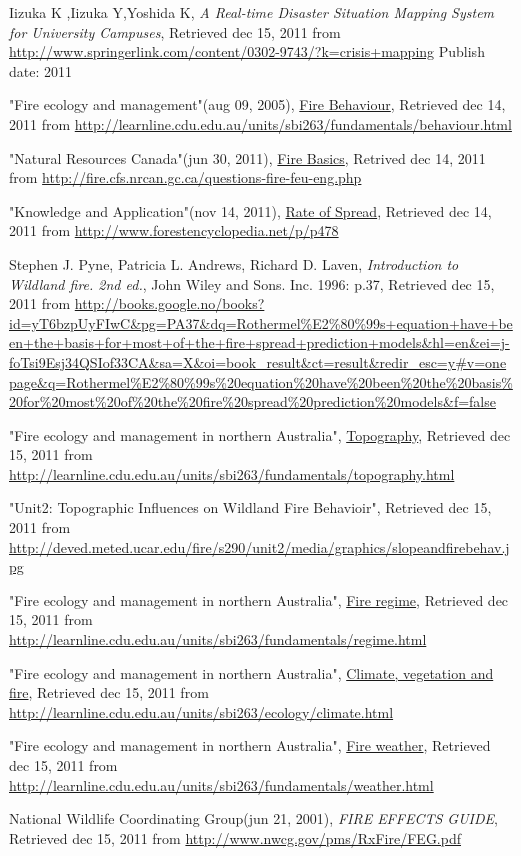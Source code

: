 \begin{thebibliography}{4}
 Iizuka K ,Iizuka Y,Yoshida K, \emph{A Real-time Disaster Situation Mapping System for University Campuses}, Retrieved dec 15, 2011 from \url{http://www.springerlink.com/content/0302-9743/?k=crisis+mapping} Publish date: 2011

 "Fire ecology and management"(aug 09, 2005), \underline{Fire Behaviour}, Retrieved dec 14, 2011 from \url{http://learnline.cdu.edu.au/units/sbi263/fundamentals/behaviour.html}

 "Natural Resources Canada"(jun 30, 2011), \underline{Fire Basics}, Retrived dec 14, 2011 from \url{http://fire.cfs.nrcan.gc.ca/questions-fire-feu-eng.php}

 "Knowledge and Application"(nov 14, 2011), \underline{Rate of Spread}, Retrieved dec 14, 2011 from \url{http://www.forestencyclopedia.net/p/p478}

 Stephen J. Pyne, Patricia L. Andrews, Richard D. Laven, \emph{Introduction to Wildland fire. 2nd ed.}, John Wiley and Sons. Inc. 1996: p.37, Retrieved dec 15, 2011 from
\url{http://books.google.no/books?id=yT6bzpUyFIwC&pg=PA37&dq=Rothermel%E2%80%99s+equation+have+been+the+basis+for+most+of+the+fire+spread+prediction+models&hl=en&ei=j-foTsi9Esj34QSIof33CA&sa=X&oi=book_result&ct=result&redir_esc=y#v=onepage&q=Rothermel%E2%80%99s%20equation%20have%20been%20the%20basis%20for%20most%20of%20the%20fire%20spread%20prediction%20models&f=false}

 "Fire ecology and management in northern Australia", \underline{Topography}, Retrieved dec 15, 2011 from \url{http://learnline.cdu.edu.au/units/sbi263/fundamentals/topography.html}

 "Unit2: Topographic Influences on Wildland Fire Behavioir", Retrieved dec 15, 2011 from \url{http://deved.meted.ucar.edu/fire/s290/unit2/media/graphics/slopeandfirebehav.jpg}

 "Fire ecology and management in northern Australia", \underline{Fire regime}, Retrieved dec 15, 2011 from \url{http://learnline.cdu.edu.au/units/sbi263/fundamentals/regime.html}

 "Fire ecology and management in northern Australia", \underline{Climate, vegetation and fire}, Retrieved dec 15, 2011 from \url{http://learnline.cdu.edu.au/units/sbi263/ecology/climate.html}

 "Fire ecology and management in northern Australia", \underline{Fire weather}, Retrieved dec 15, 2011 from \url{http://learnline.cdu.edu.au/units/sbi263/fundamentals/weather.html}

 National Wildlife Coordinating Group(jun 21, 2001), \emph{FIRE EFFECTS GUIDE}, Retrieved dec 15, 2011 from \url{http://www.nwcg.gov/pms/RxFire/FEG.pdf}

\end{thebibliography}
